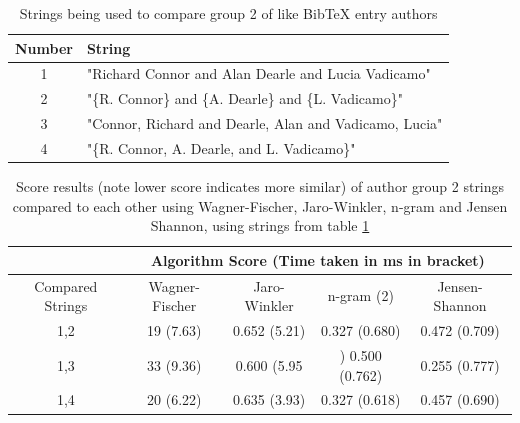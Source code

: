 \documentclass[a4paper,11pt]{article}
\begin{document}
\begin{table}[H]
      \centering
      \begin{tabular}{|c|p{}|}
      \hline
           Number &  String \\ \hline \hline
           1 & "Richard Connor and Alan Dearle and Lucia Vadicamo" \\ \hline
           2 & "\{R. Connor\} and \{A. Dearle\} and \{L. Vadicamo\}" \\ \hline
           3 & "Connor, Richard and Dearle, Alan and Vadicamo, Lucia" \\ \hline
           4 & "\{R. Connor, A. Dearle, and L. Vadicamo\}" \\
           \hline
      \end{tabular}
  \caption{Strings being used to compare group 2 of like BibTeX entry authors}
\label{table:authorsGroup2Strings}
\end{table}
    \begin{table}[H]
    \centering
       \begin{tabular}{|c|c|c|c|c|}
    \hline
     & \multicolumn{4}{c|}{Algorithm Score (Time taken in ms in bracket)}\\
     \hline
     Compared Strings  & Wagner-Fischer & Jaro-Winkler & n-gram (2) & Jensen-Shannon \\
     \hline \hline
    1,2 & 19 (7.63) & 0.652 (5.21) & 0.327 (0.680) & 0.472 (0.709) \\
             \hline
    1,3 & 33 (9.36) &
0.600 (5.95 &)
0.500 (0.762) &
0.255 (0.777)\\
    \hline
    1,4 & 20 (6.22) &
0.635 (3.93) &
0.327 (0.618) &
0.457 (0.690) \\
    \hline
    \end{tabular}
    \caption{Score results (note lower score indicates more similar) of author group 2 strings compared to each other using Wagner-Fischer, Jaro-Winkler, n-gram and Jensen Shannon, using strings from table \ref{table:authorsGroup2Strings}}
\label{table:algComparisonResultsAuthor2}
\end{table}
\end{document}
